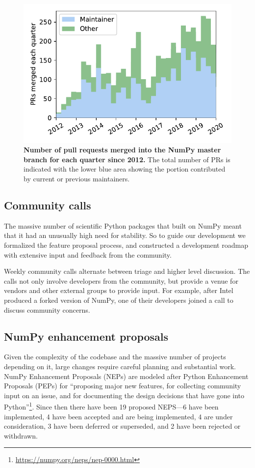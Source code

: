 \begin{figure}
    \centering
    \includegraphics[width=0.9\linewidth]{PRs-using-CURRENT_MAINTAINERS.pdf}
    \caption{\textbf{Number of pull requests merged into the NumPy master branch for each
        quarter since 2012.} The total number of PRs is indicated with the
        lower blue area showing the portion contributed by current or previous
        maintainers.}\label{fig:prs-over-time}
\end{figure}



\subsection*{Community calls}

The massive number of scientific Python packages that
built on NumPy meant that it had an unusually high need for stability.
So to guide our development we formalized the feature proposal process, and
constructed a development roadmap with extensive input and feedback from the
community.


Weekly community calls alternate between triage and
higher level discussion.  The calls not only involve developers from
the community, but provide a venue for vendors and other external
groups to provide input.  For example, after Intel produced a forked
version of NumPy, one of their developers joined a call to discuss
community concerns.

\subsection*{NumPy enhancement proposals}

Given the complexity of the codebase and the massive number of projects depending
on it, large changes require careful planning and substantial work.
NumPy Enhancement Proposals (NEPs) are modeled after
Python Enhancement Proposals (PEPs) for ``proposing major new
features, for collecting community input on an issue, and for
documenting the design decisions that have gone into
Python''\footnote{\url{https://numpy.org/neps/nep-0000.html}}.
Since then there have been 19 proposed NEPS---6 have been implemented,
4 have been accepted and are being implemented, 4 are under
consideration, 3 have been deferred or superseded, and 2 have been rejected
or withdrawn.



